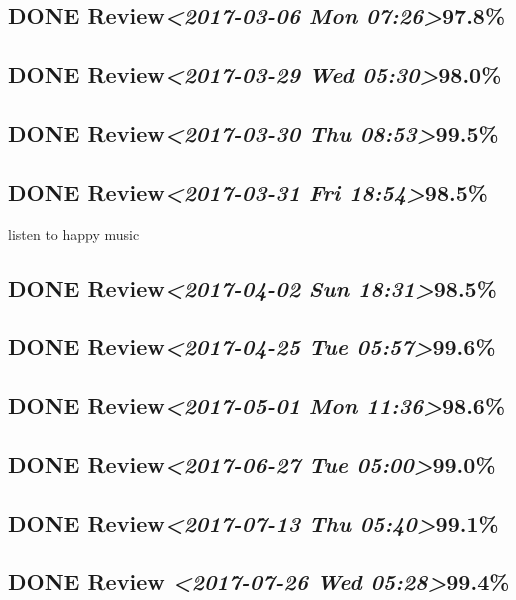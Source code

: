 \documentclass[11pt]{ctexart}
\begin{document}
\subsection{{\bfseries\sffamily DONE} Review\textit{<2017-03-06 Mon 07:26>}97.8\%}
\label{sec:orga36cceb}
\subsection{{\bfseries\sffamily DONE} Review\textit{<2017-03-29 Wed 05:30>}98.0\%}
\label{sec:org0071236}
\subsection{{\bfseries\sffamily DONE} Review\textit{<2017-03-30 Thu 08:53>}99.5\%}
\label{sec:org6ef1ed5}
\subsection{{\bfseries\sffamily DONE} Review\textit{<2017-03-31 Fri 18:54>}98.5\%}
\label{sec:org732077e}
listen to happy music
\subsection{{\bfseries\sffamily DONE} Review\textit{<2017-04-02 Sun 18:31>}98.5\%}
\label{sec:orgdf1dc92}
\subsection{{\bfseries\sffamily DONE} Review\textit{<2017-04-25 Tue 05:57>}99.6\%}
\label{sec:org6c7de6a}
\subsection{{\bfseries\sffamily DONE} Review\textit{<2017-05-01 Mon 11:36>}98.6\%}
\label{sec:org90bf4e5}
\subsection{{\bfseries\sffamily DONE} Review\textit{<2017-06-27 Tue 05:00>}99.0\%}
\label{sec:org6f0d953}
\subsection{{\bfseries\sffamily DONE} Review\textit{<2017-07-13 Thu 05:40>}99.1\%}
\label{sec:org85fc10e}
\subsection{{\bfseries\sffamily DONE} Review \textit{<2017-07-26 Wed 05:28>}99.4\%}
\label{sec:org51c332c}
\end{document}
